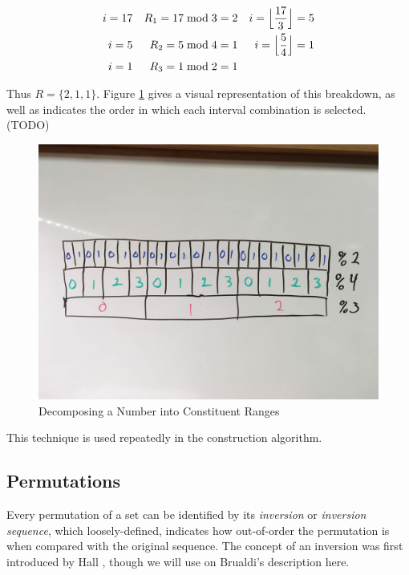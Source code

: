 \begin{align*}
i = 17   &&  R_1 = 17 \bmod 3 = 2  &&  i = \Bigl\lfloor \frac{17}{3} \Bigr\rfloor = 5   \\
i = 5    &&  R_2 = 5 \bmod 4 = 1   &&  i = \Bigl\lfloor \frac{5}{4} \Bigr\rfloor = 1    \\
i = 1    &&  R_3 = 1 \bmod 2 = 1   &&                                                   \\
\end{align*}

Thus $R = \{2, 1, 1\}$. Figure \ref{fig:interval_breakdown} gives a visual representation of this breakdown, as well as indicates the order in which each interval combination is selected. (TODO)

\begin{figure}[htb]
\centering
\centerline{\includegraphics[origin=c,width=12cm]{../figures/interval-breakdown.jpg}}
\caption{Decomposing a Number into Constituent Ranges}
\label{fig:interval_breakdown}
\end{figure}

This technique is used repeatedly in the construction algorithm.

\subsection{Permutations}

Every permutation of a set can be identified by its \textit{inversion} or \textit{inversion sequence}, which loosely-defined, indicates how out-of-order the permutation is when compared with the original sequence. The concept of an inversion was first introduced by Hall \cite{hall_automorphisms_1962}, though we will use on Brualdi's description \cite{brualdi_introductory_2010} here.


